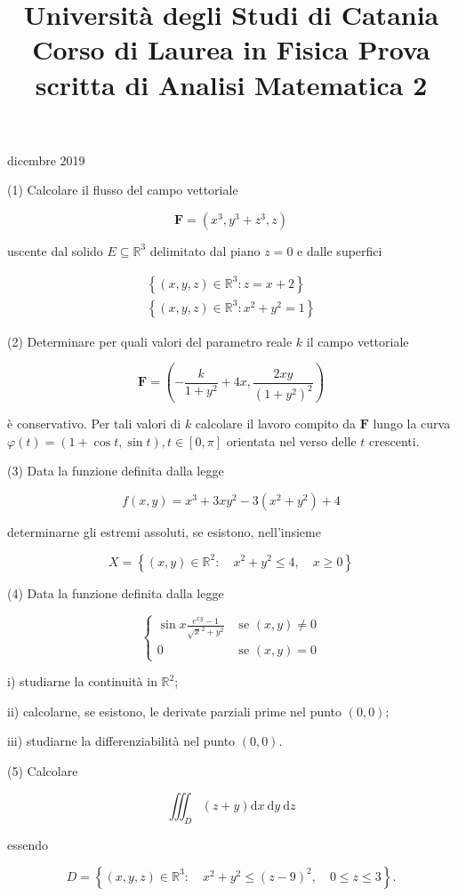 \documentclass[10pt]{article}
\title{Università degli Studi di Catania 
 Corso di Laurea in Fisica 
 Prova scritta di Analisi Matematica 2 }
\author{}
\date{}
\begin{document}
 dicembre 2019

(1) Calcolare il flusso del campo vettoriale

\[
\mathbf{F}=\left(x^{3}, y^{3}+z^{3}, z\right)
\]

uscente dal solido \(E \subseteq \mathbb{R}^{3}\) delimitato dal piano \(z=0\) e dalle superfici

\[
\begin{gathered}
\left\{(x, y, z) \in \mathbb{R}^{3}: z=x+2\right\} \\
\left\{(x, y, z) \in \mathbb{R}^{3}: x^{2}+y^{2}=1\right\}
\end{gathered}
\]

(2) Determinare per quali valori del parametro reale \(k\) il campo vettoriale

\[
\mathbf{F}=\left(-\frac{k}{1+y^{2}}+4 x, \frac{2 x y}{\left(1+y^{2}\right)^{2}}\right)
\]

è conservativo. Per tali valori di \(k\) calcolare il lavoro compito da \(\mathbf{F}\) lungo la curva \(\varphi(t)=(1+\cos t, \sin t), t \in[0, \pi]\) orientata nel verso delle \(t\) crescenti.

(3) Data la funzione definita dalla legge

\[
f(x, y)=x^{3}+3 x y^{2}-3\left(x^{2}+y^{2}\right)+4
\]

determinarne gli estremi assoluti, se esistono, nell'insieme

\[
X=\left\{(x, y) \in \mathbb{R}^{2}: \quad x^{2}+y^{2} \leq 4, \quad x \geq 0\right\}
\]

(4) Data la funzione definita dalla legge

\[
\begin{cases}\sin x \frac{e^{x y}-1}{\sqrt{x}^{2}+y^{2}} & \text { se }(x, y) \neq 0 \\ 0 & \text { se }(x, y)=0\end{cases}
\]

i) studiarne la continuità in \(\mathbb{R}^{2}\);

ii) calcolarne, se esistono, le derivate parziali prime nel punto \((0,0)\);

iii) studiarne la differenziabilità nel punto \((0,0)\).

(5) Calcolare

\[
\iiint_{D}(z+y) \mathrm{d} x \mathrm{~d} y \mathrm{~d} z
\]

essendo

\[
D=\left\{(x, y, z) \in \mathbb{R}^{3}: \quad x^{2}+y^{2} \leq(z-9)^{2}, \quad 0 \leq z \leq 3\right\} .
\]
\end{document}
